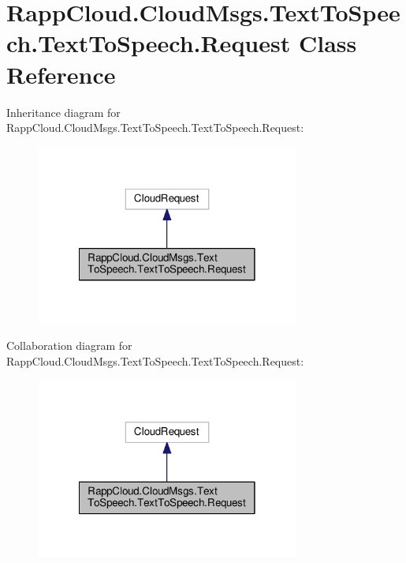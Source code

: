 \hypertarget{classRappCloud_1_1CloudMsgs_1_1TextToSpeech_1_1TextToSpeech_1_1Request}{\section{Rapp\-Cloud.\-Cloud\-Msgs.\-Text\-To\-Speech.\-Text\-To\-Speech.\-Request Class Reference}
\label{classRappCloud_1_1CloudMsgs_1_1TextToSpeech_1_1TextToSpeech_1_1Request}
}


Inheritance diagram for Rapp\-Cloud.\-Cloud\-Msgs.\-Text\-To\-Speech.\-Text\-To\-Speech.\-Request\-:
\nopagebreak
\begin{figure}[H]
\begin{center}
\leavevmode
\includegraphics[width=246pt]{classRappCloud_1_1CloudMsgs_1_1TextToSpeech_1_1TextToSpeech_1_1Request__inherit__graph}
\end{center}
\end{figure}


Collaboration diagram for Rapp\-Cloud.\-Cloud\-Msgs.\-Text\-To\-Speech.\-Text\-To\-Speech.\-Request\-:
\nopagebreak
\begin{figure}[H]
\begin{center}
\leavevmode
\includegraphics[width=246pt]{classRappCloud_1_1CloudMsgs_1_1TextToSpeech_1_1TextToSpeech_1_1Request__coll__graph}
\end{center}
\end{figure}
